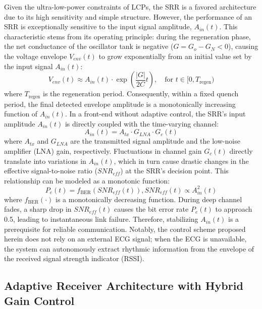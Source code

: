 \documentclass[journal]{IEEEtran}
\begin{document}
Given the ultra-low-power constraints of LCPs, the SRR is a favored architecture due to its high sensitivity and simple structure. However, the performance of an SRR is exceptionally sensitive to the input signal amplitude, $A_{in}(t)$. This characteristic stems from its operating principle: during the regeneration phase, the net conductance of the oscillator tank is negative ($G = G_o - G_N < 0$), causing the voltage envelope $V_{env}(t)$ to grow exponentially from an initial value set by the input signal $A_{in}(t)$:
\begin{equation}
    V_{env}(t) \approx A_{in}(t) \cdot \exp\left(\frac{|G|}{2C}t\right), \quad \text{for } t \in [0, T_{\text{regen}})
\end{equation}
where $T_{\text{regen}}$ is the regeneration period. Consequently, within a fixed quench period, the final detected envelope amplitude is a monotonically increasing function of $A_{in}(t)$. In a front-end without adaptive control, the SRR's input amplitude $A_{in}(t)$ is directly coupled with the time-varying channel:
\begin{equation}
    A_{in}(t) = A_{tx} \cdot G_{LNA} \cdot G_c(t)
\end{equation}
where $A_{tx}$ and $G_{LNA}$ are the transmitted signal amplitude and the low-noise amplifier (LNA) gain, respectively. Fluctuations in channel gain $G_c(t)$ directly translate into variations in $A_{in}(t)$, which in turn cause drastic changes in the effective signal-to-noise ratio ($SNR_{eff}$) at the SRR's decision point. This relationship can be modeled as a monotonic function:
\begin{equation}
    P_e(t) = f_{\text{BER}}(SNR_{eff}(t)),  SNR_{eff}(t) \propto A_{in}^2(t)
\end{equation}
where $f_{\text{BER}}(\cdot)$ is a monotonically decreasing function. During deep channel fades, a sharp drop in $SNR_{eff}(t)$ causes the bit error rate $P_e(t)$ to approach 0.5, leading to instantaneous link failure. Therefore, stabilizing $A_{in}(t)$ is a prerequisite for reliable communication. Notably, the control scheme proposed herein does not rely on an external ECG signal; when the ECG is unavailable, the system can autonomously extract rhythmic information from the envelope of the received signal strength indicator (RSSI).

\subsection{Adaptive Receiver Architecture with Hybrid Gain Control}
\label{subsec:adaptive_architecture}
\end{document}
